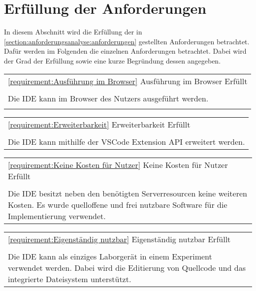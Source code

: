 \section{Erfüllung der Anforderungen}\label{section:diskussion:erfüllung-der-anforderungen}

In diesem Abschnitt wird die Erfüllung der in \autoref{section:anforderungsanalyse:anforderungen} gestellten Anforderungen betrachtet. Dafür werden im Folgenden die einzelnen Anforderungen betrachtet. Dabei wird der Grad der Erfüllung sowie eine kurze Begründung dessen angegeben.

\begin{tabularx}{\textwidth}{X}
    \toprule
    \autoref{requirement:Ausführung im Browser} \hfill Ausführung im Browser \hfill Erfüllt \\
    \\
    Die IDE kann im Browser des Nutzers ausgeführt werden.                                  \\
    \bottomrule                                                                             \\
\end{tabularx}
\begin{tabularx}{\textwidth}{X}
    \toprule
    \autoref{requirement:Erweiterbarkeit} \hfill Erweiterbarkeit \hfill Erfüllt \\
    \\
    Die IDE kann mithilfe der VSCode Extension API erweitert werden.
    \\
    \bottomrule
\end{tabularx}
\vfill
\begin{tabularx}{\textwidth}{X}
    \toprule
    \autoref{requirement:Keine Kosten für Nutzer} \hfill Keine Kosten für Nutzer \hfill Erfüllt
    \\
    \\
    Die IDE besitzt neben den benötigten Serverresourcen keine weiteren Kosten. Es wurde quelloffene und frei nutzbare Software für die Implementierung verwendet.
    \\
    \bottomrule
\end{tabularx}
\vfill
\begin{tabularx}{\textwidth}{X}
    \toprule
    \autoref{requirement:Eigenständig nutzbar} \hfill Eigenständig nutzbar \hfill Erfüllt
    \\
    \\
    Die IDE kann als einziges Laborgerät in einem Experiment verwendet werden. Dabei wird die Editierung von Quellcode und das integrierte Dateisystem unterstützt.
    \\
    \bottomrule
\end{tabularx}
